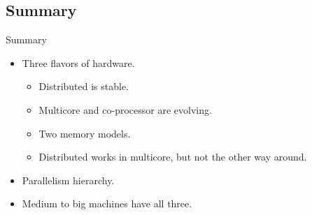 \subsection{Summary}
\makesubcontentsslidessec

\begin{frame}
  \begin{block}{Summary}
    \begin{itemize}
    \item Three flavors of hardware.
      \begin{itemize}
      \item Distributed is stable.
      \item Multicore and co-processor are evolving.
      \item Two memory models.
      \item Distributed works in multicore, but not the other way around.
      \end{itemize}
    \item Parallelism hierarchy.
    \item Medium to big machines have all three.
    \end{itemize}
  \end{block}
\end{frame}